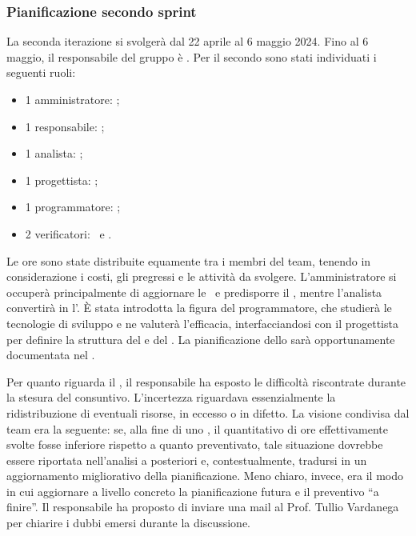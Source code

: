 \subsubsection{Pianificazione secondo sprint}
\par La seconda iterazione si svolgerà dal 22 aprile al 6 maggio 2024. Fino al 6 maggio, il
responsabile del gruppo è \raul. Per il secondo  sono stati individuati i seguenti ruoli:
\begin{itemize}
	\item 1 amministratore: \riccardo;
	\item 1 responsabile: \raul;
	\item 1 analista: \tommaso;
	\item 1 progettista: \sebastiano;
  \item 1 programmatore: \marco;
	\item 2 verificatori: \mattia\ e \martina.
\end{itemize}

\vspace{0.5\baselineskip}
\par Le ore sono state distribuite equamente tra i membri del team, tenendo in considerazione i costi, gli  pregressi e le attività da svolgere. L'amministratore si occuperà principalmente di aggiornare le \NdP\ e predisporre il \PdQ, mentre l'analista convertirà in  l'\AdR. È stata introdotta la figura del programmatore, che studierà le tecnologie di sviluppo e ne valuterà l'efficacia, interfacciandosi con il progettista per definire la struttura del  e del . La pianificazione dello  sarà opportunamente documentata nel \PdP. 
\par Per quanto riguarda il \PdP, il responsabile ha esposto le difficoltà riscontrate durante la stesura del consuntivo. L'incertezza riguardava essenzialmente la ridistribuzione di eventuali risorse, in eccesso o in difetto. La visione condivisa dal team era la seguente: se, alla fine di uno , il quantitativo di ore effettivamente svolte fosse inferiore rispetto a quanto preventivato, tale situazione dovrebbe essere riportata nell'analisi a posteriori e, contestualmente, tradursi in un aggiornamento migliorativo della pianificazione. Meno chiaro, invece, era il modo in cui aggiornare a livello concreto la pianificazione futura e il preventivo “a finire”. Il responsabile ha proposto di inviare una mail al Prof. Tullio Vardanega per chiarire i dubbi emersi durante la discussione.

